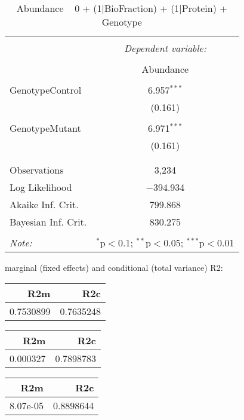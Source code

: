 \documentclass[11pt]{report}
\begin{document}
\begin{table}[!htbp] \centering 
  \caption{Abundance ~ 0 + (1|BioFraction) + (1|Protein) + Genotype} 
  \label{} 
\begin{tabular}{@{\extracolsep{5pt}}lc} 
\\[-1.8ex]\hline 
\hline \\[-1.8ex] 
 & \multicolumn{1}{c}{\textit{Dependent variable:}} \\ 
\cline{2-2} 
\\[-1.8ex] & Abundance \\ 
\hline \\[-1.8ex] 
 GenotypeControl & 6.957$^{***}$ \\ 
  & (0.161) \\ 
  & \\ 
 GenotypeMutant & 6.971$^{***}$ \\ 
  & (0.161) \\ 
  & \\ 
\hline \\[-1.8ex] 
Observations & 3,234 \\ 
Log Likelihood & $-$394.934 \\ 
Akaike Inf. Crit. & 799.868 \\ 
Bayesian Inf. Crit. & 830.275 \\ 
\hline 
\hline \\[-1.8ex] 
\textit{Note:}  & \multicolumn{1}{r}{$^{*}$p$<$0.1; $^{**}$p$<$0.05; $^{***}$p$<$0.01} \\ 
\end{tabular} 
\end{table} 
marginal (fixed effects) and conditional (total variance) R2:

\begin{tabular}{r|r}
\hline
R2m & R2c\\
\hline
0.7530899 & 0.7635248\\
\hline
\end{tabular}

\begin{tabular}{r|r}
\hline
R2m & R2c\\
\hline
0.000327 & 0.7898783\\
\hline
\end{tabular}

\begin{tabular}{r|r}
\hline
R2m & R2c\\
\hline
8.07e-05 & 0.8898644\\
\hline
\end{tabular}
\end{document}
